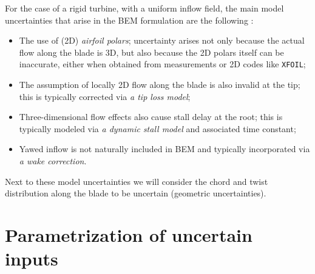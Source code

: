 For the case of a rigid turbine, with a uniform inflow field, the main model uncertainties that arise in the BEM formulation are the following \cite{Hansen1993}:
\begin{itemize}
\item The use of (2D) \textit{airfoil polars}; uncertainty arises not only because the actual flow along the blade is 3D, but also because the 2D polars itself can be inaccurate, either when obtained from measurements or 2D codes like \texttt{XFOIL};
\item The assumption of locally 2D flow along the blade is also invalid at the tip; this is typically corrected via \textit{a tip loss model};
\item Three-dimensional flow effects also cause stall delay at the root; this is typically modeled via \textit{a dynamic stall model} and associated time constant;
\item Yawed inflow is not naturally included in BEM and typically incorporated via \textit{a wake correction}.
\end{itemize}
Next to these model uncertainties we will consider the chord and twist distribution along the blade to be uncertain (geometric uncertainties).


\section{Parametrization of uncertain inputs}\label{sec:parameterization}

